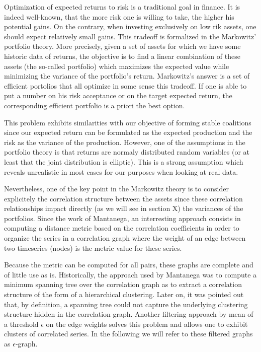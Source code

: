 \documentclass[conference]{IEEEtran}
\begin{document}
Optimization of expected returns to risk is a traditional goal in finance. It is indeed well-known, that the more risk one is willing to take, the higher his potential gains. On the contrary, when investing exclusively on low rik assets, one should expect relatively small gains. This tradeoff is formalized in the Markowitz' portfolio theory. More precisely, given a set of assets for which we have some historic data of returns, the objective is to find a linear combination of these assets (the so-called portfolio) which maximizes the expected value while minimizing the variance of the portfolio's return. Markowitz's answer is a set of efficient portolios that all optimize in some sense this tradeoff. If one is able to put a number on his risk acceptance or on the target expected return, the corresponding efficient portfolio is a priori the best option. 

This problem exhibits similarities with our objective of forming stable coalitions since our expected return can be formulated as the expected production and the risk as the variance of the production. However, one of the assumptions in the portfolio theory is that returns are normaly distributed random variables (or at least that the joint distribution is elliptic). This is a strong assumption which reveals unrealistic in most cases for our purposes when looking at real data.

Nevertheless, one of the key point in the Markowitz theory is to consider explicitely the correlation structure between the assets since these correlation relationships impact directly (as we will see in section X) the variances of the portfolios. Since the work of Mantanega, an interresting approach consists in computing a distance metric based on the correlation coefficients in order to organize the series in a correlation graph where the weight of an edge between two timeseries (nodes) is the metric value for these series.

Because the metric can be computed for all pairs, these graphs are complete and of little use as is. Historically, the approach used by Mantanega was to compute a minimum spanning tree over the correlation graph as to extract a correlation structure of the form of a hierarchical clustering. Later on, it was pointed out that, by definition, a spanning tree could not capture the underlying clustering structure hidden in the correlation graph. Another filtering approach by mean of a threshold $ \epsilon $ on the edge weights solves this problem and allows one to exhibit clusters of correlated series. In the following we will refer to these filtered graphs as $ \epsilon $-graph.
\end{document}
